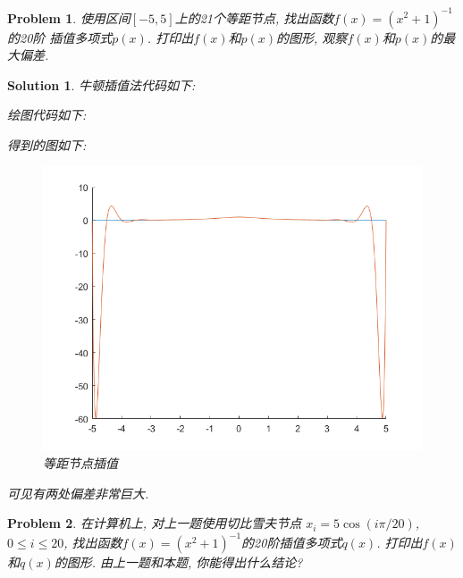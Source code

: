 \documentclass[a4paper, 12pt]{ctexart}
\let\oldlstinputlisting
\renewcommand{}[2][\empty]{
    \par\nolinenumbers\oldlstinputlisting[#1]{#2}\linenumbers\par
}
\theoremstyle{plain}
\newtheorem{problem}{Problem}[section]
\theoremstyle{plain}
\theoremstyle{plain}
\theoremstyle{nonumberplain}
\newtheorem{solution}{Solution}
\begin{document}
    \begin{problem}
        使用区间$[-5, 5]$上的21个等距节点, 找出函数$f(x)=(x^{2}+1)^{-1}$的20阶
        插值多项式$p(x)$. 打印出$f(x)$和$p(x)$的图形,
        观察$f(x)$和$p(x)$的最大偏差.
    \end{problem}

    \begin{solution}
        牛顿插值法代码如下:
        

        绘图代码如下:
        

        得到的图如下:
        \begin{figure}[H]
            \centering
            \includegraphics[scale=0.5]{3_3.png}
            \caption{等距节点插值}
        \end{figure}

        可见有两处偏差非常巨大.
    \end{solution}

    \begin{problem}
        在计算机上, 对上一题使用切比雪夫节点
        $x_{i}=5\cos{(i\pi/20)}$, $0\leq i\leq 20$,
        找出函数$f(x)=(x^{2}+1)^{-1}$的20阶插值多项式$q(x)$.
        打印出$f(x)$和$q(x)$的图形. 由上一题和本题, 你能得出什么结论?
    \end{problem}
\end{document}
